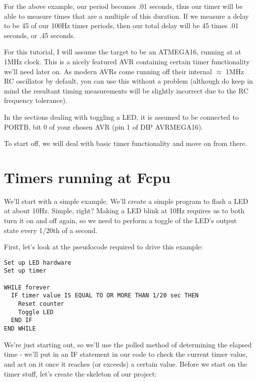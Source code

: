 \documentclass[a4paper,oneside,notitlepage]{book}
\begin{document}
For the above example, our period becomes .01 seconds, thus our timer will be able to measure times that are a multiple of this duration. If we measure a delay to be 45 of our 100Hz timer periods, then our total delay will be 45 times .01 seconds, or .45 seconds.

For this tutorial, I will assume the target to be an ATMEGA16, running at at 1MHz clock. This is a nicely featured AVR containing certain timer functionality we'll need later on. As modern AVRs come running off their internal \(\approx\) 1MHz RC oscillator by default, you can use this without a problem (although do keep in mind the resultant timing measurements will be slightly incorrect due to the RC frequency tolerance).

In the sections dealing with toggling a LED, it is assumed to be connected to PORTB, bit 0 of your chosen AVR (pin 1 of DIP AVRMEGA16).

To start off, we will deal with basic timer functionality and move on from there.

\label{chp:TimersFcpu}
\chapter{Timers running at Fcpu}

We'll start with a simple example. We'll create a simple program to flash a LED at about 10Hz. Simple, right? Making a LED blink at 10Hz requires us to both turn it on and off again, so we need to perform a toggle of the LED's output state every 1/20th of a second.

First, let's look at the pseudocode required to drive this example:

\begin{center}
\begin{lstlisting}[keywordstyle=\color{black},commentstyle=\color{black}]
Set up LED hardware
Set up timer

WHILE forever
  IF timer value IS EQUAL TO OR MORE THAN 1/20 sec THEN
    Reset counter
    Toggle LED
  END IF
END WHILE
\end{lstlisting}
\end{center}

We're just starting out, so we'll use the polled method of determining the elapsed time - we'll put in an IF statement in our code to check the current timer value, and act on it once it reaches (or exceeds) a certain value. Before we start on the timer stuff, let's create the skeleton of our project:
\end{document}
